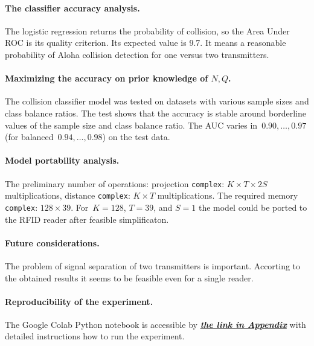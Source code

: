 \documentclass[12pt]{article}
\newcommand{\bw}{\mathbf{w}}
\newcommand{\T}{^\mathsf{T}}
\newcommand{\bx}{\mathbf{x}}
\begin{document}
\paragraph{The classifier accuracy analysis.} The logistic regression returns the probability of collision, so the Area Under ROC is its quality criterion. Its expected value is 9.7. It means a reasonable probability of Aloha collision detection for one versus two transmitters. 

\paragraph{Maximizing the accuracy on prior knowledge of $N,Q$.} %
The collision classifier model was tested on datasets with various sample sizes and class balance ratios. The test shows that the accuracy is stable around borderline values of the sample size and class balance ratio. The AUC varies in~$0.90,\ldots,0.97$ (for balanced~$0.94,\ldots,0.98$) on the test data. 

\paragraph{Model portability analysis.} The preliminary number of  operations: projection \texttt{complex}: $K \times T \times 2S$ multiplications, distance  \texttt{complex}: $K \times T$  multiplications. The required memory \texttt{complex}: $128\times 39$.  For~$K=128$, $T=39$, and  $S=1$ the model could be ported to the RFID reader after feasible simplificaton.

\paragraph{Future considerations.} The problem of signal separation of two transmitters is important. Accorting to the obtained results it seems to be feasible even for a single reader.
 
\paragraph{Reproducibility of the experiment. } The Google Colab Python notebook is accessible by  {\bf \emph{\hyperref[sec:experiment]{the link in  Appendix}}} with detailed instructions how to run the experiment.
\end{document}
